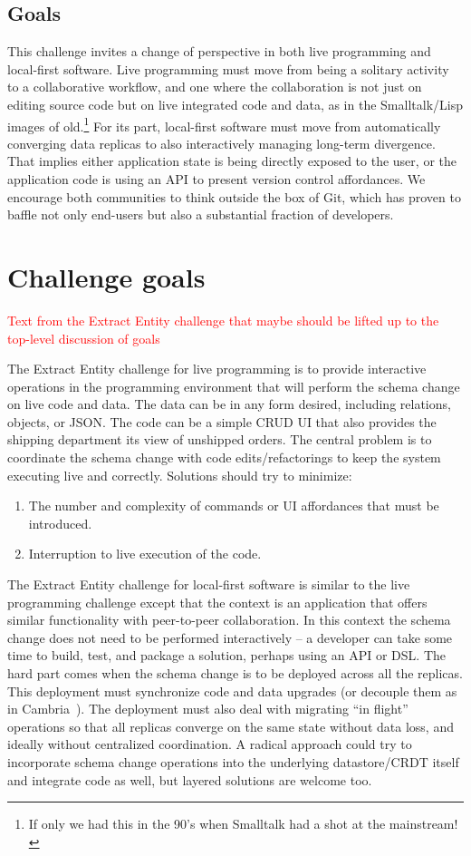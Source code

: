 \documentclass[english,submission]{programming}
\begin{document}
\subsection{Goals}
This challenge invites a change of perspective in both live programming and local-first software. Live programming must move from being a solitary activity to a collaborative workflow, and one where the collaboration is not just on editing source code but on live integrated code and data, as in the Smalltalk/Lisp images of old.\footnote{If only we had this in the 90's when Smalltalk had a shot at the mainstream!} For its part, local-first software must move from automatically converging data replicas to also interactively managing long-term divergence. That implies either application state is being directly exposed to the user, or the application code is using an API to present version control affordances. We encourage both communities to think outside the box of Git, which has proven to baffle not only end-users but also a substantial fraction of developers.


\section{Challenge goals}
\textcolor{red}{Text from the Extract Entity challenge that maybe should be lifted up to the top-level discussion of goals}


The Extract Entity challenge for live programming is to provide interactive operations in the programming environment that will perform the schema change on live code and data. The data can be in any form desired, including relations, objects, or JSON. The code can be a simple CRUD UI that also provides the shipping department its view of unshipped orders. The central problem is to coordinate the schema change with code edits/refactorings to keep the system executing live and correctly. Solutions should try to minimize:

\begin{enumerate}
  \item The number and complexity of commands or UI affordances that must be introduced.
  \item Interruption to live execution of the code.
\end{enumerate}

The Extract Entity challenge for local-first software is similar to the live programming challenge except that the context is an application that offers similar functionality with peer-to-peer collaboration. In this context the schema change does not need to be performed interactively -- a developer can take some time to build, test, and package a solution, perhaps using an API or DSL. The hard part comes when the schema change is to be deployed across all the replicas. This deployment must synchronize code and data upgrades (or decouple them as in Cambria~\cite{Cambria}). The deployment must also deal with migrating ``in flight'' operations so that all replicas converge on the same state without data loss, and ideally without centralized coordination. A radical approach could try to incorporate schema change operations into the underlying datastore/CRDT itself and integrate code as well, but layered solutions are welcome too.
\end{document}
